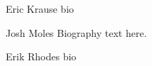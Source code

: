 \documentclass[journal]{IEEEtran}
\begin{document}


%

%


% 

\begin{IEEEbiography}{Eric Krause}
bio
\end{IEEEbiography}

\begin{IEEEbiography}{Josh Moles}
Biography text here.
\end{IEEEbiography}


\begin{IEEEbiography}{Erik Rhodes}
bio
\end{IEEEbiography}






\end{document}
